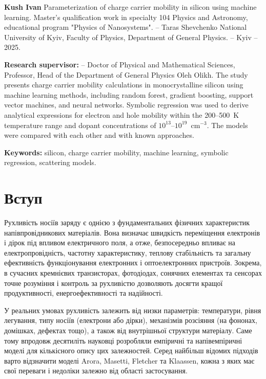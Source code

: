 \documentclass[14pt,a4paper,titlepage,oneside]{book}
\numberwithin{equation}{part}
\begin{document}
  \justifying
  \textbf{Kush Ivan} Parameterization of charge carrier mobility in silicon using machine learning. Master's qualification work in specialty 104 Physics and Astronomy, educational program "Physics of Nanosystems". – Taras Shevchenko National University of Kyiv, Faculty of Physics, Department of General Physics. – Kyiv – 2025.

  \textbf{Research supervisor:} – Doctor of Physical and Mathematical Sciences, Professor, Head of the Department of General Physics Oleh Olikh. 
  The study presents charge carrier mobility calculations in monocrystalline silicon using machine learning methods, including random forest, gradient boosting, support vector machines, and neural networks. Symbolic regression was used to derive analytical expressions for electron and hole mobility within the 200–500~K temperature range and dopant concentrations of $10^{13}$–$10^{19}$~cm$^{-3}$. The models were compared with each other and with known approaches.

\textbf{Keywords:} silicon, charge carrier mobility, machine learning, symbolic regression, scattering models.
\newpage
\renewcommand{\contentsname}{Зміст}
\tableofcontents
\newpage
\chapter*{Вступ}
Рухливість носіїв заряду є однією з фундаментальних фізичних характеристик напівпровідникових матеріалів. Вона визначає швидкість переміщення електронів і дірок під впливом електричного поля, а отже, безпосередньо впливає на електропровідність, частотну характеристику, теплову стабільність та загальну ефективність функціонування електронних і оптоелектронних пристроїв. Зокрема, в сучасних кремнієвих транзисторах, фотодіодах, сонячних елементах та сенсорах точне розуміння і контроль за рухливістю дозволяють досягти кращої продуктивності, енергоефективності та надійності.

У реальних умовах рухливість залежить від низки параметрів: температури, рівня легування, типу носіїв (електрони або дірки), механізмів розсіяння (на фононах, домішках, дефектах тощо), а також від внутрішньої структури матеріалу. Саме тому впродовж десятиліть науковці розробляли емпіричні та напівемпіричні моделі для кількісного опису цих залежностей. Серед найбільш відомих підходів варто відзначити моделі Arora, Masetti, Fletcher та Klaassen, кожна з яких має свої переваги і недоліки залежно від області застосування.
\end{document}
